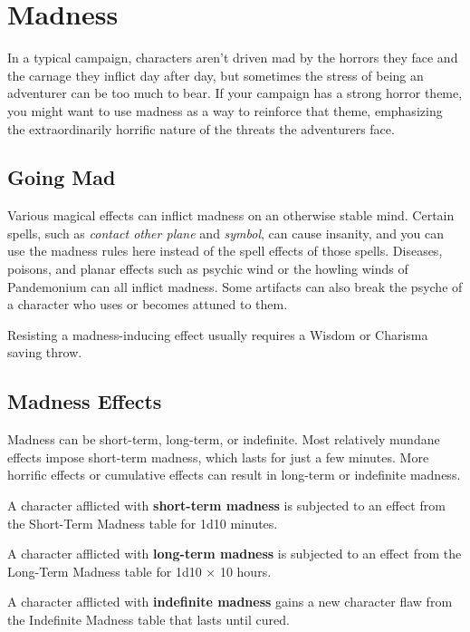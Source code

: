 \documentclass[
]{article}
\date{}
\begin{document}
\hypertarget{madness}{%
\section{Madness}\label{madness}}

In a typical campaign, characters aren't driven mad by the horrors they
face and the carnage they inflict day after day, but sometimes the
stress of being an adventurer can be too much to bear. If your campaign
has a strong horror theme, you might want to use madness as a way to
reinforce that theme, emphasizing the extraordinarily horrific nature of
the threats the adventurers face.

\hypertarget{going-mad}{%
\subsection{Going Mad}\label{going-mad}}

Various magical effects can inflict madness on an otherwise stable mind.
Certain spells, such as \emph{contact other plane} and \emph{symbol},
can cause insanity, and you can use the madness rules here instead of
the spell effects of those spells. Diseases, poisons, and planar effects
such as psychic wind or the howling winds of Pandemonium can all inflict
madness. Some artifacts can also break the psyche of a character who
uses or becomes attuned to them.

Resisting a madness-inducing effect usually requires a Wisdom or
Charisma saving throw.

\hypertarget{madness-effects}{%
\subsection{Madness Effects}\label{madness-effects}}

Madness can be short-term, long-term, or indefinite. Most relatively
mundane effects impose short-term madness, which lasts for just a few
minutes. More horrific effects or cumulative effects can result in
long-term or indefinite madness.

A character afflicted with \textbf{short-term madness} is subjected to
an effect from the Short-Term Madness table for 1d10 minutes.

A character afflicted with \textbf{long-term madness} is subjected to an
effect from the Long-Term Madness table for 1d10 × 10 hours.

A character afflicted with \textbf{indefinite madness} gains a new
character flaw from the Indefinite Madness table that lasts until cured.
\end{document}
